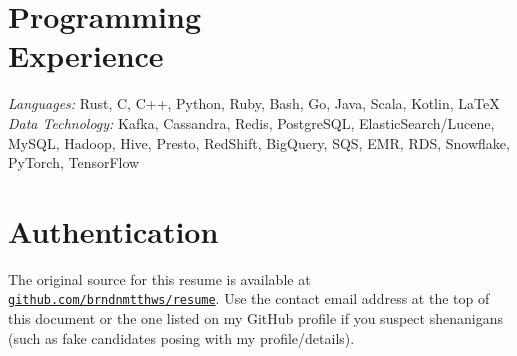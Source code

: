 \documentclass[margin,line]{resume}
\begin{document}
\begin{resume}
    \vspace{3mm}
    
    \section{\mysidestyle Programming\\Experience}

    \emph{Languages:} Rust, C, C++, Python, Ruby, Bash, Go, Java, Scala, Kotlin, \LaTeX \\
    \emph{Data Technology:} Kafka, Cassandra, Redis, PostgreSQL, ElasticSearch/Lucene,
     MySQL, Hadoop, Hive, Presto, RedShift, BigQuery, SQS, EMR, RDS, Snowflake,
     PyTorch, TensorFlow

    \section{\mysidestyle Authentication}

    The original source for this resume is available at
    \href{https://github.com/brndnmtthws/resume}{\texttt{github.com/brndnmtthws/resume}}.
    Use the contact email address at the top of this document or the one listed
    on my GitHub profile if you suspect shenanigans (such as fake candidates
    posing with my profile/details).
\end{resume}
\end{document}
